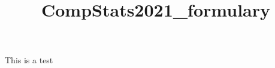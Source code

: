 \documentclass[
fourColumns,
landscape
]{formularyETH/formularyETH}
\title{CompStats2021_formulary}
\begin{document}
This is a test








\end{document}
